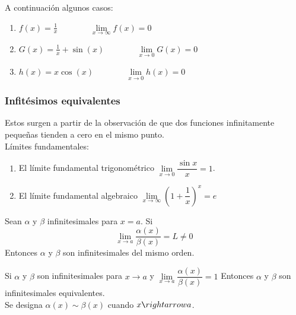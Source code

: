 \documentclass[10pt,twoside]{SelfArx} %
\begin{document}
\begin{ejemplo}
	A continuación algunos casos:\\
\begin{enumerate}
	\item $ f(x)=\frac{1}{x} \;\;\;\;\;\;\;\;\;\;\;\;\;\;	 \lim\limits_{x\rightarrow\infty}f(x)=0 $
	\item $	G(x)=\frac{1}{x}+\sin(x) \;\;\;\;\;\;\;\;\;\;\;\;\;\;	 \lim\limits_{x\rightarrow 0}G(x)=0 $
	\item $	h(x)=x\cos(x)	\;\;\;\;\;\;\;\;\;\;\;\;\;\;	\lim\limits_{x\rightarrow 0}h(x)=0 $
	
\end{enumerate}
%
\end{ejemplo}
\subsubsection{Infitésimos equivalentes}

Estos surgen a partir de la observaci\'on de que dos funciones infinitamente pequeñas tienden a cero en el mismo punto. 
\\

Límites fundamentales:
\begin{enumerate}
	\item El límite fundamental trigonom\'etrico $ \lim\limits_{x\rightarrow0}\dfrac{\sin x}{x}=1 $.
	
	\item El límite fundamental algebraico $ \lim\limits_{x\rightarrow\infty}\left (1+\dfrac{1}{x}\right )^{x}=e $
\end{enumerate}

\begin{thm}
	Sean $ \alpha $ y $ \beta $ infinitesimales para $ x=a $. Si
	\[ \lim\limits_{x\rightarrow a}\dfrac{\alpha(x)}{\beta(x)}=L\neq0 \]
	Entonces $ \alpha $ y $ \beta $  son infinitesimales del mismo orden.
	
\end{thm}

\begin{thm}
	Si $ \alpha $ y $ \beta $ son infinitesimales para $ x\rightarrow a $ y $ \lim\limits_{x\rightarrow a}\dfrac{\alpha(x)}{\beta(x)}=1 $
	Entonces $ \alpha $ y $ \beta $  son infinitesimales equivalentes.\\
	Se designa $  \alpha(x)\sim\beta(x) $  cuando $ x\verb+\+rightarrow a $.
	
\end{thm}
\end{document}
